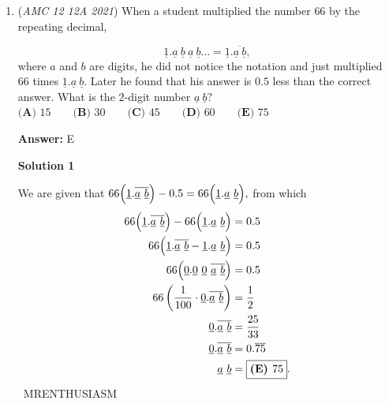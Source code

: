 \begin{enumerate}
\begin{enumerate}
\begin{itemize}
 </li>
            \end{itemize}
            Thus, $\textbf{(E)}$ is never true.

            \end{enumerate}
            Therefore, $\boxed{\textbf{(D)}}$ is our answer.

 


	\item (\textit{AMC 12 12A 2021}) When a student multiplied the number $66$ by the repeating decimal, 

 \[\underline{1}.\underline{a} \ \underline{b} \ \underline{a} \ \underline{b}\ldots=\underline{1}.\overline{\underline{a} \ \underline{b}},\] 
where $a$ and $b$ are digits, he did not notice the notation and just multiplied $66$ times $\underline{1}.\underline{a} \ \underline{b}.$ Later he found that his answer is $0.5$ less than the correct answer. What is the $2$-digit number $\underline{a} \ \underline{b}?$
$\textbf{(A) }15 \qquad \textbf{(B) }30 \qquad \textbf{(C) }45 \qquad \textbf{(D) }60 \qquad \textbf{(E) }75$

 \textbf{Answer: }E



\textbf{Solution 1}

We are given that $66\Bigl(\underline{1}.\overline{\underline{a} \ \underline{b}}\Bigr)-0.5=66\Bigl(\underline{1}.\underline{a} \ \underline{b}\Bigr),$ from which
 \begin{align*} 66\Bigl(\underline{1}.\overline{\underline{a} \ \underline{b}}\Bigr)-66\Bigl(\underline{1}.\underline{a} \ \underline{b}\Bigr)&=0.5 \\ 66\Bigl(\underline{1}.\overline{\underline{a} \ \underline{b}} - \underline{1}.\underline{a} \ \underline{b}\Bigr)&=0.5 \\ 66\Bigl(\underline{0}.\underline{0} \ \underline{0} \ \overline{\underline{a} \ \underline{b}}\Bigr)&=0.5 \\ 66\left(\frac{1}{100}\cdot\underline{0}.\overline{\underline{a} \ \underline{b}}\right)&=\frac12 \\ \underline{0}.\overline{\underline{a} \ \underline{b}}&=\frac{25}{33} \\ \underline{0}.\overline{\underline{a} \ \underline{b}}&=0.\overline{75} \\ \underline{a} \ \underline{b}&=\boxed{\textbf{(E) }75}. \end{align*}
~MRENTHUSIASM

 




\end{enumerate}

